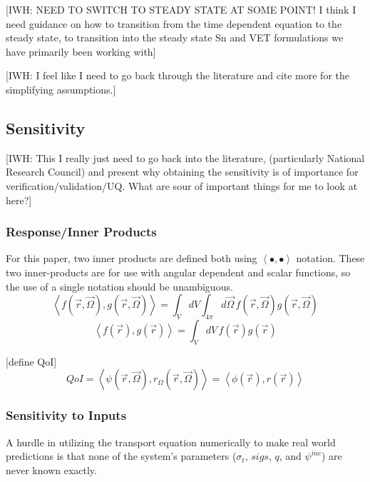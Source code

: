 \documentclass{article}
\newcommand{\vr}{\vec{r}}
\newcommand{\vO}{\vec{\Omega}}
\newcommand{\bra}{\left\langle}
\newcommand{\ket}{\right\rangle}
\newcommand{\sigt}{\sigma_t}
\newcommand{\angResp}{r_\Omega}
\newcommand{\scalResp}{r}
\newcommand{\qoi}{QoI}
\begin{document}
{\color{red}[IWH: NEED TO SWITCH TO STEADY STATE AT SOME POINT! I think I need guidance on how to transition from the time dependent equation to the steady state, to transition into the steady state Sn and VET formulations we have primarily been working with]}

{\color{red}[IWH: I feel like I need to go back through the literature and cite more for the simplifying assumptions.]}

\subsection{Sensitivity}
{\color{red}[IWH: This I really just need to go back into the literature, (particularly National Research Council) and present why obtaining the sensitivity is of importance for verification/validation/UQ. What are sour of important things for me to look at here?]}
\subsubsection{Response/Inner Products}
For this paper, two inner products are defined both using $\bra \bullet , \bullet \ket$ notation. These two inner-products are for use with angular dependent and scalar functions, so the use of a single notation should be unambiguous.
\begin{equation}
\bra f(\vr, \vO) , g(\vr, \vO) \ket  = \int_V dV \int_{4 \pi} d \vO \,  f(\vr, \vO)g(\vr, \vO)
\end{equation}
\begin{equation}
\bra f(\vr) , g(\vr) \ket  = \int_V dV \,  f(\vr)g(\vr)
\end{equation}

[define QoI]
\begin{equation}
\label{QoIDef}
\qoi = \bra \psi(\vr,\vO), \angResp(\vr,\vO) \ket = \bra \phi(\vr) , \scalResp(\vr) \ket
\end{equation}

\subsubsection{Sensitivity to Inputs}
A hurdle in utilizing the transport equation numerically to make real world predictions is that none of the system's parameters ($\sigt$, $sigs$, $q$, and $\psi^{inc}$) are never known exactly.
\end{document}
